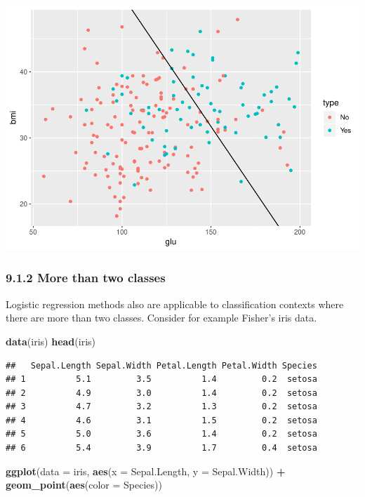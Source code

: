 \documentclass[]{article}
\newenvironment{Shaded}{\begin{snugshade}}{\end{snugshade}}
\newcommand{\KeywordTok}[1]{\textcolor[rgb]{0.13,0.29,0.53}{\textbf{#1}}}
\newcommand{\DataTypeTok}[1]{\textcolor[rgb]{0.13,0.29,0.53}{#1}}
\newcommand{\StringTok}[1]{\textcolor[rgb]{0.31,0.60,0.02}{#1}}
\newcommand{\OperatorTok}[1]{\textcolor[rgb]{0.81,0.36,0.00}{\textbf{#1}}}
\newcommand{\NormalTok}[1]{#1}
\begin{document}
\includegraphics{stt-301-programming_files/figure-latex/unnamed-chunk-174-1.pdf}

\subsubsection{9.1.2 More than two classes}\label{more-than-two-classes}

Logistic regression methods also are applicable to classification
contexts where there are more than two classes. Consider for example
Fisher's iris data.

\begin{Shaded}
\begin{Highlighting}[]
\KeywordTok{data}\NormalTok{(iris)}
\KeywordTok{head}\NormalTok{(iris)}
\end{Highlighting}
\end{Shaded}

\begin{verbatim}
##   Sepal.Length Sepal.Width Petal.Length Petal.Width Species
## 1          5.1         3.5          1.4         0.2  setosa
## 2          4.9         3.0          1.4         0.2  setosa
## 3          4.7         3.2          1.3         0.2  setosa
## 4          4.6         3.1          1.5         0.2  setosa
## 5          5.0         3.6          1.4         0.2  setosa
## 6          5.4         3.9          1.7         0.4  setosa
\end{verbatim}

\begin{Shaded}
\begin{Highlighting}[]
\KeywordTok{ggplot}\NormalTok{(}\DataTypeTok{data =}\NormalTok{ iris, }\KeywordTok{aes}\NormalTok{(}\DataTypeTok{x =}\NormalTok{ Sepal.Length, }\DataTypeTok{y =}\NormalTok{ Sepal.Width)) }\OperatorTok{+}
\StringTok{    }\KeywordTok{geom_point}\NormalTok{(}\KeywordTok{aes}\NormalTok{(}\DataTypeTok{color =}\NormalTok{ Species))}
\end{Highlighting}
\end{Shaded}
\end{document}
